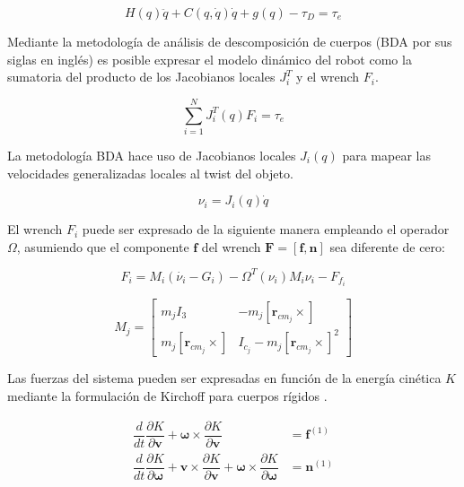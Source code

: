 \begin{equation}\label{eq: lagrangiano_modelo}
H(q)\ddot{q} + C(q,\dot{q})\dot{q} +g(q) - \tau_D = \tau_e
\end{equation}

Mediante la metodología de 
análisis de descomposición de cuerpos 
(BDA por sus siglas en inglés) \cite{olguin2019multibody} 
es posible expresar
el modelo dinámico del robot como la sumatoria 
del producto de los Jacobianos locales 
$J_i^T$ y el wrench $F_i$.

\begin{equation}
\sum_{i=1}^N J_i^T(q)F_i = \tau_e
\end{equation}

La metodología BDA hace uso de Jacobianos locales $J_i(q)$
para mapear las velocidades generalizadas locales 
al twist del objeto.

\begin{equation} \label{eq: twist_loc}
\nu_i = J_i(q)\dot{q}
\end{equation}

El wrench $F_i$ puede ser expresado de la siguiente 
manera empleando el operador $\Omega$, asumiendo que el 
componente $\mathbf f$ del wrench $\mathbf F = [\mathbf f, \mathbf n]$ sea diferente de cero:

\begin{equation}
F_i = M_i(\dot{\nu_i} - G_i) - \Omega^T(\nu_i)M_i\nu_i - F_{f_{i}}
\end{equation}

\begin{equation}
 M_j = \begin{bmatrix}
        m_j I_3 & -m_j [\mathbf r_{cm_j} \times]\\
        m_j [\mathbf r_{cm_j} \times] & I_{c_j} -m_j [\mathbf r_{cm_j} \times]^2
       \end{bmatrix}
\end{equation}


Las fuerzas del sistema pueden ser expresadas en función de la 
energía cinética $K$ mediante la 
formulación de Kirchoff para cuerpos rígidos \cite{olguin20183d}.

\begin{subequations}\label{eq: kirchoff}
 \begin{align}
  \dfrac{d}{dt} \dfrac{\partial K}{\partial \mathbf v} + \boldsymbol \omega \times \dfrac{\partial K}{\partial \mathbf v} &= \mathbf f^{(1)}\\
  \dfrac{d}{dt} \dfrac{\partial K}{\partial \boldsymbol \omega} + \mathbf v \times \dfrac{\partial K}{\partial \mathbf v}  + \boldsymbol \omega \times \dfrac{\partial K}{\partial \boldsymbol \omega} &= \mathbf n^{(1)}
 \end{align}
\end{subequations}

